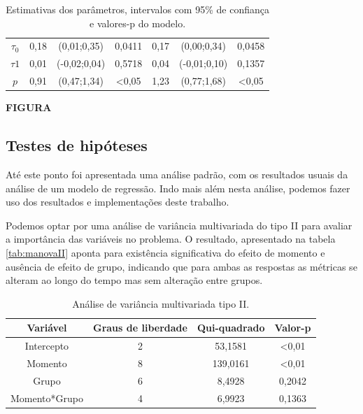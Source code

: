 \documentclass[AMA,STIX1COL]{WileyNJD-v2}
\begin{document}
\begin{table}[H]
\begin{tabular}{c|cccccc}
$\tau_0$                   & 0,18       & (0,01;0,35)                                                       & \multicolumn{1}{c|}{0,0411} & 0,17       & (0,00;0,34)                                                       & 0,0458           \\
$\tau1$                    & 0,01       & (-0,02;0,04)                                                      & \multicolumn{1}{c|}{0,5718}           & 0,04       & (-0,01;0,10)                                                      & 0,1357           \\
$p$                        & 0,91       & (0,47;1,34)                                                       & \multicolumn{1}{c|}{\textless 0,05} & 1,23       & (0,77;1,68)                                                       & \textless 0,05 \\ \hline
\end{tabular}
\caption{Estimativas dos parâmetros, intervalos com 95\% de confiança e valores-p do modelo.}
\label{tab:estimativas}
\end{table}

\textbf{FIGURA}

\subsection{Testes de hipóteses}
  
Até este ponto foi apresentada uma análise padrão, com os resultados usuais da análise de um modelo de regressão. Indo mais além nesta análise, podemos fazer uso dos resultados e implementações deste trabalho.

Podemos optar por uma análise de variância multivariada do tipo II para avaliar a importância das variáveis no problema. O resultado, apresentado na tabela \autoref{tab:manovaII} aponta para existência significativa do efeito de momento e ausência de efeito de grupo, indicando que para ambas as respostas as métricas se alteram ao longo do tempo mas sem alteração entre grupos.

\begin{table}[H]
\centering
\begin{tabular}{cccc}
\hline
Variável      & Graus de liberdade & Qui-quadrado & Valor-p        \\ \hline
Intercepto    & 2                  & 53,1581      & \textless 0,01 \\
Momento       & 8                  & 139,0161     & \textless 0,01 \\
Grupo         & 6                  & 8,4928       & 0,2042         \\
Momento*Grupo & 4                  & 6,9923       & 0,1363         \\ \hline
\end{tabular}
\caption{Análise de variância multivariada tipo II.}
\label{tab:manovaII}
\end{table}
\end{document}
